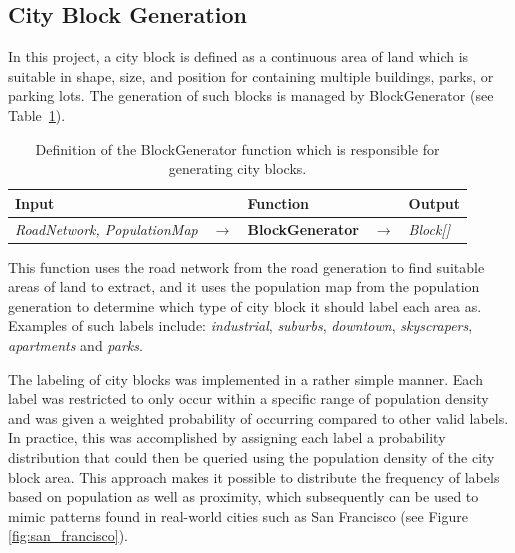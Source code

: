 \subsection{City Block Generation}

In this project, a city block is defined as a continuous area of land which is suitable in shape, size, and position for containing multiple buildings, parks, or parking lots.
The generation of such blocks is managed by BlockGenerator (see Table~\ref{table:blockgen}).

\begin{table}[H]
  \centering
  \begin{tabular}{lllll}
    \textbf{Input}                           &               & \textbf{Function}            &               & \textbf{Output}         \\
    \midrule
    \textit{RoadNetwork, PopulationMap}      & $\rightarrow$ & \textbf{BlockGenerator}      & $\rightarrow$ & \textit{Block[]}        \\
    \bottomrule
  \end{tabular}

  \caption{Definition of the BlockGenerator function which is responsible for generating city blocks.}
  \label{table:blockgen}
\end{table}
\vspace{-0.4cm} %

This function uses the road network from the road generation to find suitable areas of land to extract, and it uses the population map from the population generation to determine which type of city block it should label each area as.
Examples of such labels include: \textit{industrial}, \textit{suburbs}, \textit{downtown}, \textit{skyscrapers}, \textit{apartments} and \textit{parks}.

The labeling of city blocks was implemented in a rather simple manner.
Each label was restricted to only occur within a specific range of population density and was given a weighted probability of occurring compared to other valid labels.
In practice, this was accomplished by assigning each label a probability distribution that could then be queried using the population density of the city block area.
This approach makes it possible to distribute the frequency of labels based on population as well as proximity, which subsequently can be used to mimic patterns found in real-world cities such as San Francisco (see Figure \ref{fig:san_francisco}).

